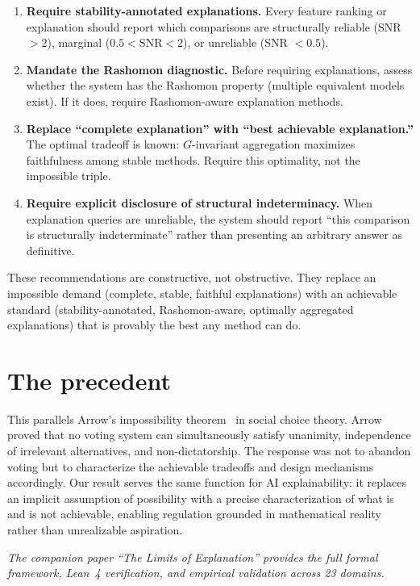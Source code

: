 \documentclass[11pt]{article}
\begin{document}
\begin{enumerate}
  \item \textbf{Require stability-annotated explanations.}  Every feature
    ranking or explanation should report which comparisons are structurally
    reliable (SNR $> 2$), marginal ($0.5 < \text{SNR} < 2$), or unreliable
    (SNR $< 0.5$).

  \item \textbf{Mandate the Rashomon diagnostic.}  Before requiring
    explanations, assess whether the system has the Rashomon property
    (multiple equivalent models exist).  If it does, require
    Rashomon-aware explanation methods.

  \item \textbf{Replace ``complete explanation'' with ``best achievable
    explanation.''}  The optimal tradeoff is known:
    $G$-invariant aggregation maximizes faithfulness among stable methods.
    Require this optimality, not the impossible triple.

  \item \textbf{Require explicit disclosure of structural indeterminacy.}
    When explanation queries are unreliable, the system should report ``this
    comparison is structurally indeterminate'' rather than presenting an
    arbitrary answer as definitive.
\end{enumerate}

These recommendations are constructive, not obstructive.  They replace an
impossible demand (complete, stable, faithful explanations) with an achievable
standard (stability-annotated, Rashomon-aware, optimally aggregated
explanations) that is provably the best any method can do.

\section*{The precedent}

This parallels Arrow's impossibility theorem~\citep{arrow1951social} in
social choice theory.  Arrow proved that no voting system can simultaneously
satisfy unanimity, independence of irrelevant alternatives, and
non-dictatorship.  The response was not to abandon voting but to
characterize the achievable tradeoffs and design mechanisms accordingly.
Our result serves the same function for AI explainability: it replaces an
implicit assumption of possibility with a precise characterization of what
is and is not achievable, enabling regulation grounded in mathematical
reality rather than unrealizable aspiration.

\bigskip
\noindent\textit{The companion paper ``The Limits of Explanation'' provides
the full formal framework, Lean~4 verification, and empirical validation
across 23 domains.}



\end{document}

